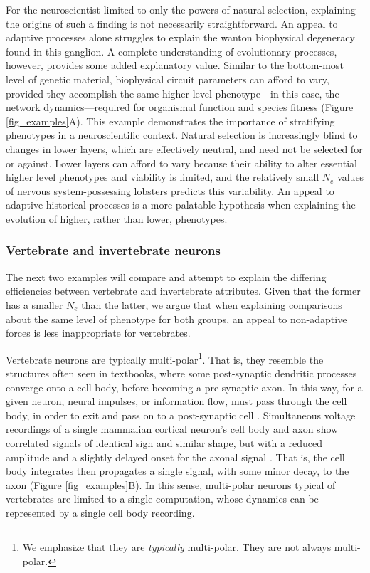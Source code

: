 \documentclass[twocolumn]{article}
\begin{document}
For the neuroscientist limited to only the powers of natural selection, explaining the origins of such a finding is not necessarily straightforward. An appeal to adaptive processes alone struggles to explain the wanton biophysical degeneracy found in this ganglion. A complete understanding of evolutionary processes, however, provides some added explanatory value. Similar to the bottom-most level of genetic material, biophysical circuit parameters can afford to vary, provided they accomplish the same higher level phenotype---in this case, the network dynamics---required for organismal function and species fitness (Figure \ref{fig_examples}A). This example demonstrates the importance of stratifying phenotypes in a neuroscientific context. Natural selection is increasingly blind to changes in lower layers, which are effectively neutral, and need not be selected for or against. Lower layers can afford to vary because their ability to alter essential higher level phenotypes and viability is limited, and the relatively small $N_e$ values of nervous system-possessing lobsters predicts this variability. An appeal to adaptive historical processes is a more palatable hypothesis when explaining the evolution of higher, rather than lower, phenotypes.

\subsubsection{Vertebrate and invertebrate neurons}

The next two examples will compare and attempt to explain the differing efficiencies between vertebrate and invertebrate attributes. Given that the former has a smaller $N_e$ than the latter, we argue that when explaining comparisons about the same level of phenotype for both groups, an appeal to non-adaptive forces is less inappropriate for vertebrates. 

Vertebrate neurons are typically multi-polar\footnote{We emphasize that they are \textit{typically} multi-polar. They are not always multi-polar.}. That is, they resemble the structures often seen in textbooks, where some post-synaptic dendritic processes converge onto a cell body, before becoming a pre-synaptic axon. In this way, for a given neuron, neural impulses, or information flow, must pass through the cell body, in order to exit and pass on to a post-synaptic cell \cite{Goaillard_2020, kandel2013principles}. Simultaneous voltage recordings of a single mammalian cortical neuron's cell body and axon show correlated signals of identical sign and similar shape, but with a reduced amplitude and a slightly delayed onset for the axonal signal \cite{hu_bean_2018}. That is, the cell body integrates then propagates a single signal, with some minor decay, to the axon (Figure \ref{fig_examples}B). In this sense, multi-polar neurons typical of vertebrates are limited to a single computation, whose dynamics can be represented by a single cell body recording. 
\end{document}
